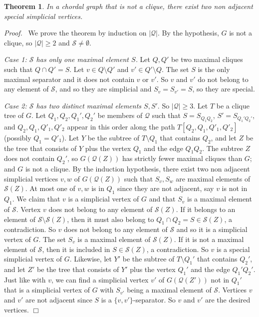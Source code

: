 \documentclass[11pt]{article}
\newtheorem{theorem}{Theorem}
\newenvironment{proof}{\noindent \emph{Proof.}\ }{\hfill
    $\Box$\vspace{1em}}
\begin{document}
\begin{theorem}
\label{special}
In a chordal graph that is not a clique, there exist two non adjacent
special simplicial vertices.
\end{theorem}
\begin{proof}
We prove the theorem by induction on $|\mathcal Q|$.  By the
hypothesis, $G$ is not a clique, so $|\mathcal Q|\geq 2$ and $\mathcal
S \neq\emptyset$.

\emph{Case 1: $\mathcal S$ has only one maximal element $S$.} Let
$Q,Q'$ be two maximal cliques such that $Q\cap Q'=S$.  Let $v\in
Q\setminus Q'$ and $v'\in Q'\setminus Q$.  The set $S$ is the only
maximal separator and it does not contain $v$ or $v'$.  So $v$ and
$v'$ do not belong to any element of $\mathcal S$, and so they are
simplicial and $S_v=S_{v'}=S$, so they are special.

\emph{Case 2: $\mathcal S$ has two distinct maximal elements $S,S'$}.
So $|\mathcal Q|\ge 3$.  Let $T$ be a clique tree of $G$.  Let $Q_1,
Q_2, Q_1', Q_2'$ be members of $\mathcal Q$ such that $S=S_{Q_1Q_2}$,
$S'=S_{Q_1'Q_2'}$, and $Q_2,Q_1,Q'_1,Q'_2$ appear in this order along
the path $T[Q_2, Q_1, Q'_1, Q'_2]$ (possibly $Q_1=Q'_1$).  Let $Y$ be
the subtree of $T\setminus Q_1$ that contains $Q_2$, and let $Z$ be
the tree that consists of $Y$ plus the vertex $Q_1$ and the edge
$Q_1Q_2$.  The subtree $Z$ does not contain $Q_2'$, so $G (\mathcal
Q(Z))$ has strictly fewer maximal cliques than $G$; and $G$ is not a
clique.  By the induction hypothesis, there exist two non adjacent
simplicial vertices $v, w$ of $G(\mathcal Q(Z))$ such that $S_{v},
S_{w}$ are maximal elements of $\mathcal S(Z)$.  At most one of $v,w$
is in $Q_1$ since they are not adjacent, say $v$ is not in $Q_1$.  We
claim that $v$ is a simplicial vertex of $G$ and that $S_v$ is a
maximal element of $\mathcal S$.  Vertex $v$ does not belong to any
element of $\mathcal S(Z)$.  If it belongs to an element of $\mathcal
S\setminus \mathcal S(Z)$, then it must also belong to $Q_1\cap Q_2 =S
\in\mathcal S(Z)$, a contradiction.  So $v$ does not belong to any
element of $\mathcal S$ and so it is a simplicial vertex of $G$.  The
set $S_v$ is a maximal element of $\mathcal S(Z)$.  If it is not a
maximal element of $\mathcal S$, then it is included in $S \in\mathcal
S(Z)$, a contradiction.  So $v$ is a special simplicial vertex of $G$.
Likewise, let $Y'$ be the subtree of $T\setminus Q_1'$ that contains
$Q_2'$, and let $Z'$ be the tree that consists of $Y'$ plus the vertex
$Q_1'$ and the edge $Q_1'Q_2'$.  Just like with $v$, we can find a
simplicial vertex $v'$ of $G(\mathcal Q(Z'))$ not in $Q_1'$ that is a
simplicial vertex of $G$ with $S_{v'}$ being a maximal element of
$\mathcal S$.  Vertices $v$ and $v'$ are not adjacent since $S$ is a
$\{v, v'\}$-separator.  So $v$ and $v'$ are the desired vertices.
\end{proof}
\end{document}
